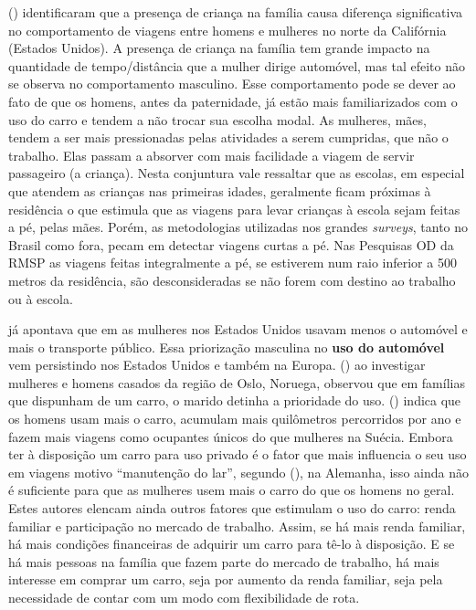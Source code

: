  (\citeyear{GODDARD2006}) identificaram que a presença de criança na família causa diferença significativa no comportamento de viagens entre homens e mulheres no norte da Califórnia (Estados Unidos). A presença de criança na família tem grande impacto na quantidade de tempo/distância que a mulher dirige automóvel, mas tal efeito não se observa no comportamento masculino. 
Esse comportamento pode se dever ao fato de que os homens, antes da paternidade, já estão mais familiarizados com o uso do carro e tendem a não trocar sua escolha modal. 
As mulheres, mães, tendem a ser mais pressionadas pelas atividades a serem cumpridas, que não o trabalho. Elas passam a absorver com mais facilidade a viagem de servir passageiro (a criança). Nesta conjuntura vale ressaltar que as escolas, em especial que atendem as crianças nas primeiras idades, geralmente ficam próximas à residência o que estimula que as viagens para levar crianças à escola sejam feitas a pé, pelas mães. Porém, as metodologias utilizadas nos grandes \emph{surveys}, tanto no Brasil como fora, pecam em detectar viagens curtas a pé. Nas Pesquisas OD da RMSP as viagens feitas integralmente a pé, se estiverem num raio inferior a 500 metros da residência, são desconsideradas se não forem com destino ao trabalho ou à escola.





 já apontava que em \citeyear{FOX1983} as mulheres nos Estados Unidos usavam menos o automóvel e mais o transporte público. Essa priorização masculina no \textbf{uso do automóvel} vem persistindo nos Estados Unidos %
e também na Europa.  (\citeyear{HJORTHOL2000}) ao investigar mulheres e homens casados da região de Oslo, Noruega, observou que em famílias que dispunham de um carro, o marido detinha a prioridade do uso.  (\citeyear{POLK2003}) indica que os homens usam mais o carro, acumulam mais quilômetros percorridos por ano e fazem mais viagens como ocupantes únicos do que mulheres na Suécia.
Embora ter à disposição um carro para uso privado é o fator que mais influencia o seu uso em viagens motivo ``manutenção do lar'', segundo  (\citeyear{BEST2005}), na Alemanha, isso ainda não é suficiente para que as mulheres usem mais o carro do que os homens no geral. 
Estes autores elencam ainda outros fatores que estimulam o uso do carro: renda familiar e participação no mercado de trabalho. Assim, se há mais renda familiar, há mais condições financeiras de adquirir um carro para tê-lo à disposição. E se há mais pessoas na família que fazem parte do mercado de trabalho, há mais interesse em comprar um carro, seja por aumento da renda familiar, seja pela necessidade de contar com um modo com flexibilidade de rota.




